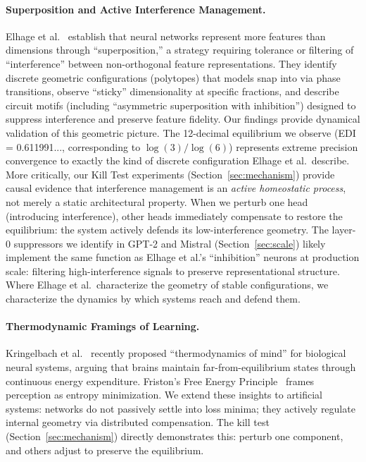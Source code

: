 \paragraph{Superposition and Active Interference Management.}
Elhage et al.~\cite{elhage2022superposition} establish that neural networks represent more features than dimensions through ``superposition,'' a strategy requiring tolerance or filtering of ``interference'' between non-orthogonal feature representations. They identify discrete geometric configurations (polytopes) that models snap into via phase transitions, observe ``sticky'' dimensionality at specific fractions, and describe circuit motifs (including ``asymmetric superposition with inhibition'') designed to suppress interference and preserve feature fidelity. Our findings provide dynamical validation of this geometric picture. The 12-decimal equilibrium we observe (EDI = 0.611991..., corresponding to $\log(3)/\log(6)$) represents extreme precision convergence to exactly the kind of discrete configuration Elhage et al.\ describe. More critically, our Kill Test experiments (Section~\ref{sec:mechanism}) provide causal evidence that interference management is an \textit{active homeostatic process}, not merely a static architectural property. When we perturb one head (introducing interference), other heads immediately compensate to restore the equilibrium: the system actively defends its low-interference geometry. The layer-0 suppressors we identify in GPT-2 and Mistral (Section~\ref{sec:scale}) likely implement the same function as Elhage et al.'s ``inhibition'' neurons at production scale: filtering high-interference signals to preserve representational structure. Where Elhage et al.\ characterize the geometry of stable configurations, we characterize the dynamics by which systems reach and defend them.

\paragraph{Thermodynamic Framings of Learning.}
Kringelbach et al.~\cite{kringelbach2024thermodynamics} recently proposed ``thermodynamics of mind'' for biological neural systems, arguing that brains maintain far-from-equilibrium states through continuous energy expenditure. Friston's Free Energy Principle~\cite{friston2010free} frames perception as entropy minimization. We extend these insights to artificial systems: networks do not passively settle into loss minima; they actively regulate internal geometry via distributed compensation. The kill test (Section~\ref{sec:mechanism}) directly demonstrates this: perturb one component, and others adjust to preserve the equilibrium.

